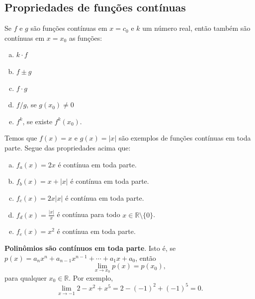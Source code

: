 \subsection{Propriedades de funções contínuas}

Se $f$ e $g$ são funções contínuas em $x=c_0$ e $k$ um número real, então também são contínuas em $x=x_0$ as funções:
\begin{enumerate}[a)]
\item $k\cdot f$
\item $f\pm g$
\item $f\cdot g$
\item $f/g$, se $g(x_0)\neq 0$
\item $f^k$, se existe $f^k(x_0)$.
\end{enumerate}

\begin{ex}
  Temos que $f(x) = x$ e $g(x) = |x|$ são exemplos de funções contínuas em toda parte. Segue das propriedades acima que:
  \begin{enumerate}[a)]
  \item $f_a(x) = 2x$ é contínua em toda parte.
  \item $f_b(x) = x + |x|$ é contínua em toda parte.
  \item $f_c(x) = 2x|x|$ é contínua em toda parte.
  \item $f_d(x) = \frac{|x|}{x}$ é contínua para todo $x\in\mathbb{R}\setminus\{0\}$.
  \item $f_e(x) = x^2$ é contínua em toda parte.
  \end{enumerate}
\end{ex}

\begin{ex}
  {\bf Polinômios são contínuos em toda parte}. Isto é, se $p(x) = a_nx^n+a_{n-1}x^{n-1}+\cdots+a_1x+a_0$, então
  \begin{equation}
    \lim_{x\to x_0} p(x) = p(x_0),
  \end{equation}
  para qualquer $x_0\in\mathbb{R}$. Por exemplo,
  \begin{equation}
    \lim_{x\to -1} 2 - x^2 + x^5 = 2 - (-1)^2 + (-1)^5 = 0.
  \end{equation}
\end{ex}

